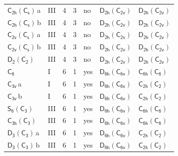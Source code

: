 \documentclass[10pt,a4paper]{article}
\numberwithin{equation}{section}
\newcommand{\grp}[1]{\mathsf{#1}}
\newcommand{\clsletter}[1]{\,{\scriptsize\color{black!55}#1}}
\begin{document}
{\begin{longtable}{@{}llrrlll@{}}
\href{C2h-C1v.pdf}{$\grp{C_{2h}}(\grp{C_{s}})$}\clsletter{a} & III & 4 & 3 & no & \href{D2h-C2v.pdf}{$\grp{D_{2h}}(\grp{C_{2v}})$} & \href{D2h-C2v.pdf}{$\grp{D_{2h}}(\grp{C_{2v}})$}\\
\href{C2h-C1v.pdf}{$\grp{C_{2h}}(\grp{C_{s}})$}\clsletter{b} & III & 4 & 3 & no & \href{D2h-C2v.pdf}{$\grp{D_{2h}}(\grp{C_{2v}})$} & \href{D2h-C2v.pdf}{$\grp{D_{2h}}(\grp{C_{2v}})$}\\
\href{C2v-C1v.pdf}{$\grp{C_{2v}}(\grp{C_{s}})$}\clsletter{a} & III & 4 & 3 & no & \href{D2h-C2v.pdf}{$\grp{D_{2h}}(\grp{C_{2v}})$} & \href{D2h-C2v.pdf}{$\grp{D_{2h}}(\grp{C_{2v}})$}\\
\href{C2v-C1v.pdf}{$\grp{C_{2v}}(\grp{C_{s}})$}\clsletter{b} & III & 4 & 3 & no & \href{D2h-C2v.pdf}{$\grp{D_{2h}}(\grp{C_{2v}})$} & \href{D2h-C2v.pdf}{$\grp{D_{2h}}(\grp{C_{2v}})$}\\
\href{D2-C2.pdf}{$\grp{D_{2}}(\grp{C_{2}})$} & III & 4 & 3 & no & \href{D2h-C2v.pdf}{$\grp{D_{2h}}(\grp{C_{2v}})$} & \href{D2h-C2v.pdf}{$\grp{D_{2h}}(\grp{C_{2v}})$}\\
\href{../../../rotation/data/pdf/C6.pdf}{$\grp{C_{6}}$} & I & 6 & 1 & yes & \href{D6h-C6v.pdf}{$\grp{D_{6h}}(\grp{C_{6v}})$} & \href{C6h-C6.pdf}{$\grp{C_{6h}}(\grp{C_{6}})$}\\
\href{../../../rotation/data/pdf/C3v.pdf}{$\grp{C_{3v}}$}\clsletter{a} & I & 6 & 1 & yes & \href{D6h-C6v.pdf}{$\grp{D_{6h}}(\grp{C_{6v}})$} & \href{C2h-C2.pdf}{$\grp{C_{2h}}(\grp{C_{2}})$}\\
\href{../../../rotation/data/pdf/C3v.pdf}{$\grp{C_{3v}}$}\clsletter{b} & I & 6 & 1 & yes & \href{D6h-C6v.pdf}{$\grp{D_{6h}}(\grp{C_{6v}})$} & \href{C2h-C2.pdf}{$\grp{C_{2h}}(\grp{C_{2}})$}\\
\href{S6-C3.pdf}{$\grp{S_{6}}(\grp{C_{3}})$} & III & 6 & 1 & yes & \href{D6h-C6v.pdf}{$\grp{D_{6h}}(\grp{C_{6v}})$} & \href{C6h-C6.pdf}{$\grp{C_{6h}}(\grp{C_{6}})$}\\
\href{C3h-C3.pdf}{$\grp{C_{3h}}(\grp{C_{3}})$} & III & 6 & 1 & yes & \href{D6h-C6v.pdf}{$\grp{D_{6h}}(\grp{C_{6v}})$} & \href{C6h-C6.pdf}{$\grp{C_{6h}}(\grp{C_{6}})$}\\
\href{D3-C3.pdf}{$\grp{D_{3}}(\grp{C_{3}})$}\clsletter{a} & III & 6 & 1 & yes & \href{D6h-C6v.pdf}{$\grp{D_{6h}}(\grp{C_{6v}})$} & \href{C2h-C2.pdf}{$\grp{C_{2h}}(\grp{C_{2}})$}\\
\href{D3-C3.pdf}{$\grp{D_{3}}(\grp{C_{3}})$}\clsletter{b} & III & 6 & 1 & yes & \href{D6h-C6v.pdf}{$\grp{D_{6h}}(\grp{C_{6v}})$} & \href{C2h-C2.pdf}{$\grp{C_{2h}}(\grp{C_{2}})$}\\

\end{longtable}}
\end{document}
